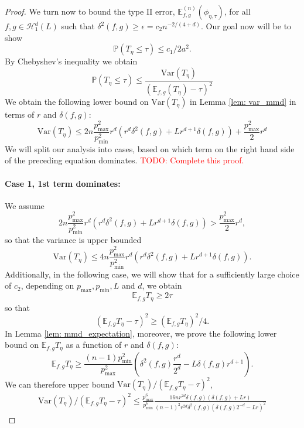 \documentclass{article}
\newcommand{\Var}{\mathrm{Var}}
\newcommand{\1}{\mathbb{I}}
\newcommand{\Pbb}{\mathbb{P}}
\newcommand{\Ebb}{\mathbb{E}}
\theoremstyle{alden}
\theoremstyle{aldenthm}
\theoremstyle{definition}
\theoremstyle{remark}
\begin{document}
\begin{proof}
	We turn now to bound the type II error, $\Ebb_{f,g}^{(n)}(\phi_{\eta,\tau})$, for all $f,g \in \mathcal{H}_{1}^{d}(L)$ such that $\delta^2(f,g) \geq \epsilon = c_2 n^{-2/(4+d)}$. Our goal now will be to show
	\begin{equation*}
	\Pbb \left(T_{\eta} \leq \tau \right) \leq c_1/2a^2.
	\end{equation*}
	By Chebyshev's inequality we obtain
	\begin{equation}
	\label{eqn: mmd_minimax_optimal_4}
	\Pbb(T_{\eta} \leq \tau) \leq \frac{\Var(T_{\eta})}{(\Ebb_{f,g}(T_{\eta}) - \tau)^2}
	\end{equation}
	We obtain the following lower bound on $\Var(T_{\eta})$ in Lemma \ref{lem: var_mmd} in terms of $r$ and $\delta(f,g)$:
	\begin{equation*}
	\Var(T_{\eta}) \leq 2n \frac{p_{\max}^2}{p_{\min}^2} r^d \left(r^d \delta^2(f,g) + Lr^{d+1}\delta(f,g)\right) + \frac{p_{\max}^2}{2}r^d
	\end{equation*}
	We will split our analysis into cases, based on which term on the right hand side of the preceding equation dominates. \textcolor{red}{TODO: Complete this proof.}
	
	\paragraph{Case 1, 1st term dominates:}
	We assume
	\begin{equation*}
	2n \frac{p_{\max}^2}{p_{\min}^2} r^d \left(r^d \delta^2(f,g) + Lr^{d+1}\delta(f,g)\right) > \frac{p_{\max}^2}{2}r^d,
	\end{equation*}
	so that the variance is upper bounded
	\begin{equation*}
	\Var(T_{\eta}) \leq 4 n \frac{p_{\max}^2}{p_{\min}^2} r^d \left(r^d \delta^2(f,g) + Lr^{d+1}\delta(f,g)\right).
	\end{equation*}
	Additionally, in the following case, we will show that for a sufficiently large choice of $c_2$, depending on $p_{\max}, p_{\min}, L$ and $d$, we obtain
	\begin{equation*}
	\Ebb_{f,g} T_{\eta} \geq 2 \tau
	\end{equation*}
	so that 
	\begin{equation*}
	(\Ebb_{f,g} T_{\eta} - \tau)^2 \geq \left(\Ebb_{f,g} T_{\eta}\right)^2/4.
	\end{equation*}
	In Lemma \ref{lem: mmd_expectation}, moreover, we prove the following lower bound on $\Ebb_{f,g} T_{\eta}$ as a function of $r$ and $\delta(f,g)$:
	\begin{equation*}
	\Ebb_{f,g} T_{\eta} \geq \frac{(n - 1)p_{\min}^2}{ p_{\max}^2} \left(\delta^2(f,g)\frac{r^d}{2^d} - L\delta(f,g)r^{d + 1}\right).
	\end{equation*}
	We can therefore upper bound $\Var(T_{\eta})/(\Ebb_{f,g}T_{\eta} - \tau)^2$,
	\begin{align*}
	\Var(T_{\eta})/(\Ebb_{f,g}T_{\eta} - \tau)^2 \leq \frac{p_{\max}^6}{p_{\min}^6}  \frac{16 n r^{2d} \delta(f,g) \left(\delta(f,g) + Lr\right)}{(n-1)^2 r^{2d} \delta^2(f,g) \left(\delta(f,g){2^{-d}} - Lr\right)^2}
	\end{align*}
	

\end{proof}
\end{document}
